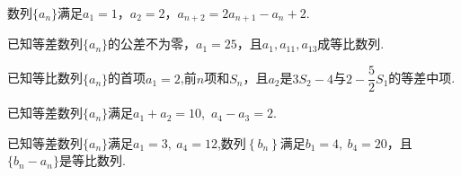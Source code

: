 \documentclass[marginline,noindent,answers,adobefonts]{BHCexam}
\newcommand{\an}{\{a_n\}}
\newcommand{\sn}{S_n}
\begin{document}
\begin{questions}
\kongbai
\qs 数列$\an$满足$a_1=1$，$a_2=2$，$a_{n+2}=2a_{n+1}-a_n+2$.
\kongbai
\qs 已知等差数列$\an$的公差不为零，$a_1=25$，且$a_1,a_{11},a_{13}$成等比数列.
\kongbai
\qs
已知等比数列$\an$的首项$a_1=2$,前$ n $项和$ \sn $，且$ a_2 $是$ 3S_2-4 $与$ 2-\dfrac{5}{2}S_1 $的等差中项.
\kongbai
\qs 已知等差数列$\{a_n\}$满足$ a_1+a_2=10 $,\ $a_4-a_3=2$.
\kongbai
\qs 已知等差数列$\{a_n\}$满足$a_1=3,~a_4=12$,数列$ \left\{b_n\right\} $满足$ b_1=4,~b_4=20 $，且$\{b_n-a_n\}  $是等比数列.
\begin{parts}

\end{parts}
\end{questions}
\end{document}
